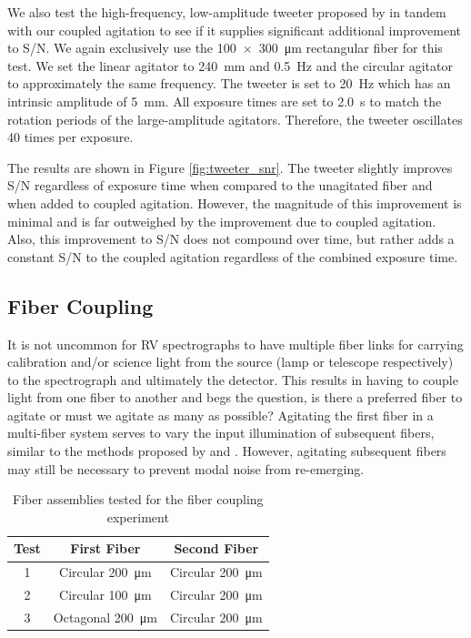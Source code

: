 We also test the high-frequency, low-amplitude tweeter proposed by \citet{plavchan_precision_2013} in tandem with our coupled agitation to see if it supplies significant additional improvement to S/N. We again exclusively use the \SI{100x300}{\micro\meter} rectangular fiber for this test. We set the linear agitator to \SI{240}{\milli\meter} and \SI{0.5}{\hertz} and the circular agitator to approximately the same frequency. The tweeter is set to \SI{20}{\hertz} which has an intrinsic amplitude of \SI{5}{\milli\meter}. All exposure times are set to \SI{2.0}{\second} to match the rotation periods of the large-amplitude agitators. Therefore, the tweeter oscillates 40 times per exposure.

The results are shown in Figure \ref{fig:tweeter_snr}. The tweeter slightly improves S/N regardless of exposure time when compared to the unagitated fiber and when added to coupled agitation. However, the magnitude of this improvement is minimal and is far outweighed by the improvement due to coupled agitation. Also, this improvement to S/N does not compound over time, but rather adds a constant S/N to the coupled agitation regardless of the combined exposure time.

\subsection{Fiber Coupling}

It is not uncommon for RV spectrographs to have multiple fiber links for carrying calibration and/or science light from the source (lamp or telescope respectively) to the spectrograph and ultimately the detector. This results in having to couple light from one fiber to another and begs the question, is there a preferred fiber to agitate or must we agitate as many as possible? Agitating the first fiber in a multi-fiber system serves to vary the input illumination of subsequent fibers, similar to the methods proposed by \citet{mahadevan_suppression_2014} and \citet{halverson_habitable-zone_2014}. However, agitating subsequent fibers may still be necessary to prevent modal noise from re-emerging.

\begin{table}
\centering
\caption{Fiber assemblies tested for the fiber coupling experiment}
	\begin{tabular}{ccc}
	\hline
	Test & First Fiber & Second Fiber \\
	\hline \hline
	1 & Circular \SI{200}{\micro\meter} & Circular \SI{200}{\micro\meter} \\
	\hline
	2 & Circular \SI{100}{\micro\meter} & Circular \SI{200}{\micro\meter} \\
	\hline
	3 & Octagonal \SI{200}{\micro\meter} & Circular \SI{200}{\micro\meter} \\
	\hline
	\end{tabular}
\label{table:fiber_coupling}
\end{table}

